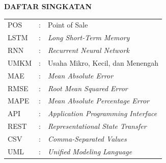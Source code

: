\clearpage
{}
{}

\begin{center}
    \large \textbf{DAFTAR SINGKATAN}
\end{center}
\vspace{3em}

\begin{center}
    \begin{table}[htbp]
        \begin{tabular}{l c l}
            POS             &:& Point of Sale \\
            LSTM            &:& \textit{Long Short-Term Memory} \\
            RNN             &:& \textit{Recurrent Neural Network} \\
            UMKM            &:& Usaha Mikro, Kecil, dan Menengah \\
            MAE             &:& \textit{Mean Absolute Error} \\
            RMSE            &:& \textit{Root Mean Squared Error} \\
            MAPE            &:& \textit{Mean Absolute Percentage Error} \\
            API             &:& \textit{Application Programming Interface} \\
            REST            &:& \textit{Representational State Transfer} \\
            CSV             &:& \textit{Comma-Separated Values} \\
            UML             &:& \textit{Unified Modeling Language} \\
        \end{tabular}
    \end{table}
\end{center}


